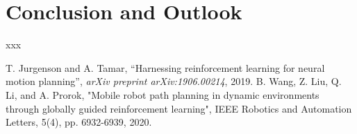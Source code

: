 \documentclass[conference]{IEEEtran}
\begin{document}
\section{Conclusion and Outlook} 

xxx

\begin{thebibliography}{00}
 T. Jurgenson and A. Tamar, ``Harnessing reinforcement learning for neural
motion planning'',  \textit{arXiv preprint arXiv:1906.00214}, 2019.
 B. Wang, Z. Liu, Q. Li, and A. Prorok, "Mobile robot path planning in dynamic environments through globally guided reinforcement learning",  IEEE Robotics and Automation Letters, 5(4), pp. 6932-6939, 2020.
\end{thebibliography}
\end{document}
